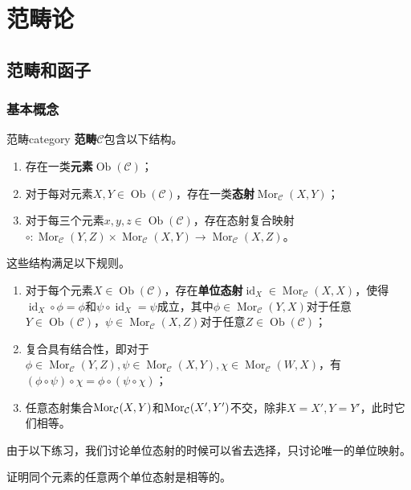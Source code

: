 \documentclass[../main.tex]{subfiles}
\begin{document}
\setcounter{chapter}{1}
\chapter{范畴论}\label{cha:category_theory}
\section{范畴和函子}
\subsection{基本概念}
\begin{definition}{范畴}{category}
\textbf{范畴}$\mathcal{C}$包含以下结构。
\begin{enumerate}
    \item 存在一类\textbf{元素}$\operatorname{Ob}(\mathcal{C})$；
    \item 对于每对元素$X,Y\in\operatorname{Ob}(\mathcal{C})$，存在一类\textbf{态射}$\operatorname{Mor}_\mathcal{C}(X,Y)$；
    \item 对于每三个元素$x,y,z\in\operatorname{Ob}(\mathcal{C})$，存在态射复合映射${\circ}:\operatorname{Mor}_\mathcal{C}(Y,Z)\times\operatorname{Mor}_{\mathcal{C}}(X,Y)\to\operatorname{Mor}_\mathcal{C}(X,Z)$。
\end{enumerate}
这些结构满足以下规则。
\begin{enumerate}
    \item 对于每个元素$X\in\operatorname{Ob}(\mathcal{C})$，存在\textbf{单位态射}$\operatorname{id}_X\in\operatorname{Mor}_\mathcal{C}(X,X)$，使得$\operatorname{id}_X\circ\phi=\phi$和$\psi\circ\operatorname{id}_X=\psi$成立，其中$\phi\in\operatorname{Mor}_\mathcal{C}(Y,X)$对于任意$Y\in\operatorname{Ob}(\mathcal{C})$，$\psi\in\operatorname{Mor}_\mathcal{C}(X,Z)$对于任意$Z\in\operatorname{Ob}(\mathcal{C})$；
    \item 复合具有结合性，即对于$\phi\in\operatorname{Mor}_\mathcal{C}(Y,Z),\psi\in\operatorname{Mor}_\mathcal{C}(X,Y),\chi\in\operatorname{Mor}_\mathcal{C}(W,X)$，有$(\phi\circ\psi)\circ\chi=\phi\circ(\psi\circ\chi)$；
    \item 任意态射集合$\operatorname{Mor}_\mathcal{C}(X,Y)$和$\operatorname{Mor}_\mathcal{C}(X',Y')$不交，除非$X=X',Y=Y'$，此时它们相等。
\end{enumerate}
\end{definition}
由于以下练习，我们讨论单位态射的时候可以省去选择，只讨论唯一的单位映射。
\begin{exercise}{}
证明同个元素的任意两个单位态射是相等的。
\end{exercise}
\end{document}
